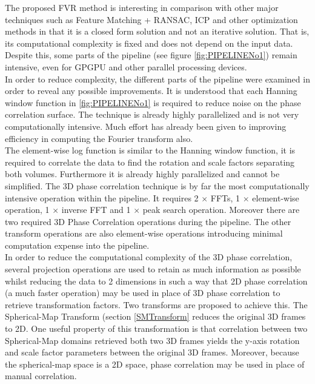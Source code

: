 
The proposed FVR method is interesting in comparison with other major techniques such as Feature Matching + RANSAC, ICP and other optimization methods in that it is a closed form solution and not an iterative solution. That is, its computational complexity is fixed and does not depend on the input data. Despite this, some parts of the pipeline (see figure \ref{fig:PIPELINENo1}) remain intensive, even for GPGPU and other parallel processing devices. \\

In order to reduce complexity, the different parts of the pipeline were examined in order to reveal any possible improvements. It is understood that each Hanning window function in \ref{fig:PIPELINENo1} is required to reduce noise on the phase correlation surface. The technique is already highly parallelized and is not very computationally intensive. Much effort has already been given to improving efficiency in computing the Fourier transform also. \\

The element-wise log function is similar to the Hanning window function, it is required to correlate the data to find the rotation and scale factors separating both volumes. Furthermore it is already highly parallelized and cannot be simplified. The 3D phase correlation technique is by far the most computationally intensive operation within the pipeline. It requires 2 $\times$ FFTs, 1 $\times$ element-wise operation, 1 $\times$ inverse FFT and 1 $\times$ peak search operation. Moreover there are two required 3D Phase Correlation operations during the pipeline. The other transform operations are also element-wise operations introducing minimal computation expense into the pipeline. \\

In order to reduce the computational complexity of the 3D phase correlation, several projection operations are used to retain as much information as possible whilst reducing the data to 2 dimensions in such a way that 2D phase correlation (a much faster operation) may be used in place of 3D phase correlation to retrieve transformation factors. Two transforms are proposed to achieve this. The Spherical-Map Transform (section \ref{SMTransform} reduces the original 3D frames to 2D. One useful property of this transformation is that correlation between two Spherical-Map domains retrieved both two 3D frames yields the y-axis rotation and scale factor parameters between the original 3D frames. Moreover, because the spherical-map space is a 2D space, phase correlation may be used in place of manual correlation.  \\

